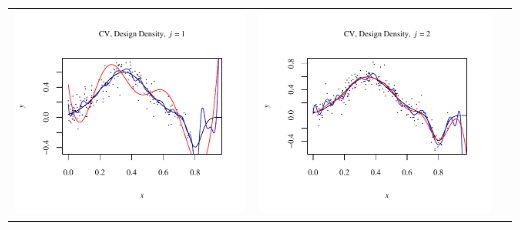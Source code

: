 \documentclass[11pt]{article}
\begin{document}
\begin{table}[h!]
  \begin{center}
    \renewcommand{\arraystretch}{1.5}
    \begin{tabular}{| >{\centering\arraybackslash}m{2.1in} |  >{\centering\arraybackslash}m{2.1in} |  >{\centering\arraybackslash}m{2.1in}|}
      \hline
      \includegraphics[width=1\linewidth,height=0.18\textheight]{Graphs/1/2/assignment5_a_1_2_1}&
      \includegraphics[width=1\linewidth,height=0.18\textheight]{Graphs/1/2/assignment5_a_1_2_2}&

\end{tabular}
\end{center}
\end{table}
\end{document}

